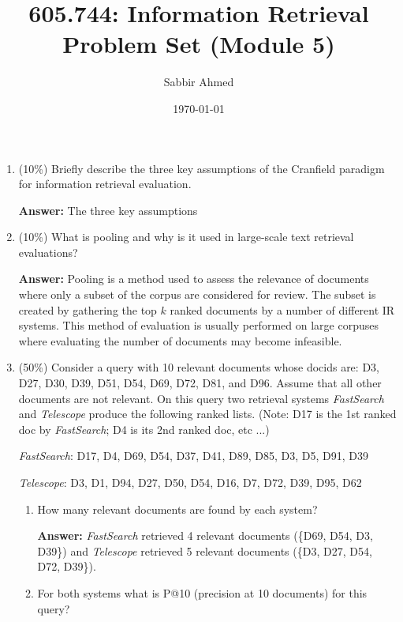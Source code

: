 \documentclass[11pt]{article}
\title{605.744: Information Retrieval \\ Problem Set (Module 5)}
\author{Sabbir Ahmed}
\date{\today}
\begin{document}
\maketitle

    \begin{enumerate}

        \item (10\%) Briefly describe the three key assumptions of the Cranfield paradigm for information retrieval evaluation.

        \textbf{Answer:} The three key assumptions 

        \item (10\%) What is pooling and why is it used in large-scale text retrieval evaluations?

        \textbf{Answer:} Pooling is a method used to assess the relevance of documents where only a subset of the corpus are considered for review. The subset is created by gathering the top $k$ ranked documents by a number of different IR systems. This method of evaluation is usually performed on large corpuses where evaluating the number of documents may become infeasible.

        \item (50\%) Consider a query with 10 relevant documents whose docids are: 
        D3, D27, D30, D39, D51, D54, D69, D72, D81, and D96. Assume that all other documents are not relevant. On this query two retrieval systems \textit{FastSearch} and \textit{Telescope} produce the following ranked lists. (Note: D17 is the 1st ranked doc by \textit{FastSearch}; D4 is its 2nd ranked doc, etc ...)

        \textit{FastSearch}: D17, D4, D69, D54, D37, D41, D89, D85, D3, D5, D91, D39

        \textit{Telescope}: D3, D1, D94, D27, D50, D54, D16, D7, D72, D39, D95, D62

        \begin{enumerate}

            \item How many relevant documents are found by each system?

            \textbf{Answer:} \textit{FastSearch} retrieved 4 relevant documents (\{D69, D54, D3, D39\}) and \textit{Telescope} retrieved 5 relevant documents (\{D3, D27, D54, D72, D39\}).

            \item For both systems what is P@10 (precision at 10 documents) for this query?


\end{enumerate}
\end{enumerate}
\end{document}
